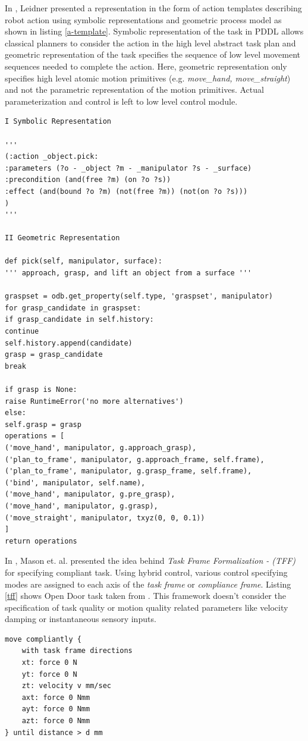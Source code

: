 \documentclass[thesis]{mas_proposal}
\begin{document}
In \cite{leidner2017cognitive}, Leidner presented a representation in the form of action templates describing robot action using symbolic representations and geometric process model as shown in listing \ref{a-template}.  Symbolic representation of the task in PDDL allows classical planners to consider the action in the high level abstract task plan and geometric representation of the task specifies the sequence of low level movement sequences needed to complete the action. Here, geometric representation only specifies high level atomic motion primitives (e.g. \textit{move\_hand, move\_straight}) and not the parametric representation of the motion primitives. Actual parameterization and control is left to low level control module.   

\begin{lstlisting}[label=a-template,caption=Action Template: \_object.pick]
I Symbolic Representation 

'''
(:action _object.pick: 
:parameters (?o - _object ?m - _manipulator ?s - _surface) 
:precondition (and(free ?m) (on ?o ?s)) 
:effect (and(bound ?o ?m) (not(free ?m)) (not(on ?o ?s)))
) 
''' 

II Geometric Representation

def pick(self, manipulator, surface):
''' approach, grasp, and lift an object from a surface '''

graspset = odb.get_property(self.type, 'graspset', manipulator) 
for grasp_candidate in graspset: 
if grasp_candidate in self.history: 
continue
self.history.append(candidate) 
grasp = grasp_candidate 
break

if grasp is None: 
raise RuntimeError('no more alternatives')
else: 
self.grasp = grasp
operations = [
('move_hand', manipulator, g.approach_grasp), 
('plan_to_frame', manipulator, g.approach_frame, self.frame), ('plan_to_frame', manipulator, g.grasp_frame, self.frame), 
('bind', manipulator, self.name), 
('move_hand', manipulator, g.pre_grasp), 
('move_hand', manipulator, g.grasp), 
('move_straight', manipulator, txyz(0, 0, 0.1))
] 
return operations
\end{lstlisting}

In \cite{mason1981compliance}, Mason et. al. presented the idea behind \textit{Task Frame Formalization - (TFF)} for specifying compliant task. Using hybrid control, various control specifying modes are assigned to each axis of the \textit{task frame} or \textit{compliance frame}\cite{nagele2018prototype}. Listing \ref{tff} shows Open Door task taken from \cite{bruyninckx1996specification}. This framework doesn't consider the specification of task quality or motion quality related parameters like velocity damping or instantaneous sensory inputs. 
\begin{lstlisting}[label=tff,caption=Task Specification using TFF: Open Door]
move compliantly {
	with task frame directions
	xt: force 0 N
	yt: force 0 N
	zt: velocity v mm/sec
	axt: force 0 Nmm
	ayt: force 0 Nmm
	azt: force 0 Nmm
} until distance > d mm 
\end{lstlisting}
\end{document}
